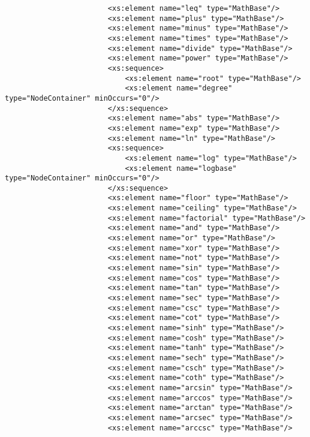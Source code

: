 \begin{footnotesize}
\begin{verbatim}
                        <xs:element name="leq" type="MathBase"/>
                        <xs:element name="plus" type="MathBase"/>
                        <xs:element name="minus" type="MathBase"/>
                        <xs:element name="times" type="MathBase"/>
                        <xs:element name="divide" type="MathBase"/>
                        <xs:element name="power" type="MathBase"/>
                        <xs:sequence>
                            <xs:element name="root" type="MathBase"/>
                            <xs:element name="degree" type="NodeContainer" minOccurs="0"/>
                        </xs:sequence>
                        <xs:element name="abs" type="MathBase"/>
                        <xs:element name="exp" type="MathBase"/>
                        <xs:element name="ln" type="MathBase"/>
                        <xs:sequence>
                            <xs:element name="log" type="MathBase"/>
                            <xs:element name="logbase" type="NodeContainer" minOccurs="0"/>
                        </xs:sequence>
                        <xs:element name="floor" type="MathBase"/>
                        <xs:element name="ceiling" type="MathBase"/>
                        <xs:element name="factorial" type="MathBase"/>
                        <xs:element name="and" type="MathBase"/>
                        <xs:element name="or" type="MathBase"/>
                        <xs:element name="xor" type="MathBase"/>
                        <xs:element name="not" type="MathBase"/>
                        <xs:element name="sin" type="MathBase"/>
                        <xs:element name="cos" type="MathBase"/>
                        <xs:element name="tan" type="MathBase"/>
                        <xs:element name="sec" type="MathBase"/>
                        <xs:element name="csc" type="MathBase"/>
                        <xs:element name="cot" type="MathBase"/>
                        <xs:element name="sinh" type="MathBase"/>
                        <xs:element name="cosh" type="MathBase"/>
                        <xs:element name="tanh" type="MathBase"/>
                        <xs:element name="sech" type="MathBase"/>
                        <xs:element name="csch" type="MathBase"/>
                        <xs:element name="coth" type="MathBase"/>
                        <xs:element name="arcsin" type="MathBase"/>
                        <xs:element name="arccos" type="MathBase"/>
                        <xs:element name="arctan" type="MathBase"/>
                        <xs:element name="arcsec" type="MathBase"/>
                        <xs:element name="arccsc" type="MathBase"/>

\end{verbatim}
\end{footnotesize}
